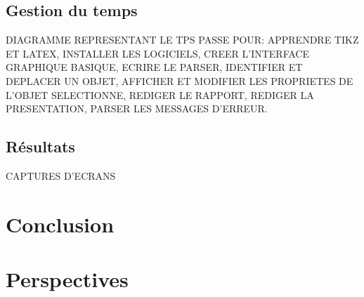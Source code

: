 \documentclass[a4paper]{report}
\begin{document}
  \subsection{Gestion du temps}
  DIAGRAMME REPRESENTANT LE TPS PASSE POUR: APPRENDRE TIKZ ET LATEX, INSTALLER LES LOGICIELS, CREER L'INTERFACE GRAPHIQUE BASIQUE, ECRIRE LE PARSER, IDENTIFIER ET DEPLACER UN OBJET, AFFICHER ET MODIFIER LES PROPRIETES DE L'OBJET SELECTIONNE, REDIGER LE RAPPORT, REDIGER LA PRESENTATION, PARSER LES MESSAGES D'ERREUR.
 
  \subsection{Résultats}
  CAPTURES D'ECRANS
  \section{Conclusion}
  \section{Perspectives}
   
\end{document}
